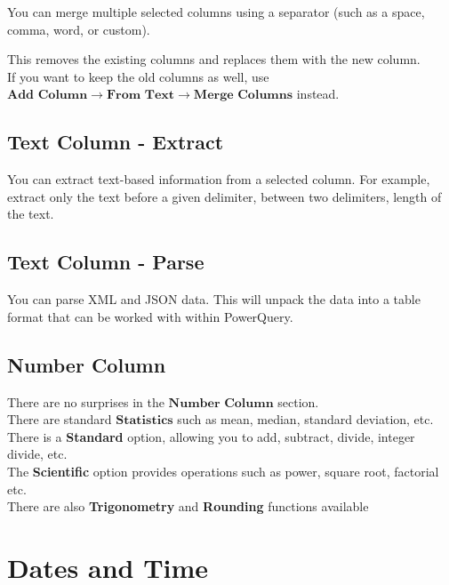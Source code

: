 \documentclass[10pt, openany, twocolumn]{book}
\begin{document}
You can merge multiple selected columns using a separator (such as a space, comma, word, or custom). 

\begin{tcolorbox}[colback=yellow!2!white, colframe=yellow!60!gray]
This removes the existing columns and replaces them with the new column.\\

If you want to keep the old columns as well, use $\textbf{Add Column} \rightarrow \textbf{From Text} \rightarrow \textbf{Merge Columns}$ instead. 
\end{tcolorbox}

\subsection*{Text Column - Extract}

You can extract text-based information from a selected column. For example, extract only the text before a given delimiter, between two delimiters, length of the text.

\subsection*{Text Column - Parse}

You can parse XML and JSON data. This will unpack the data into a table format that can be worked with within PowerQuery.

\subsection*{Number Column} 

There are no surprises in the $\textbf{Number Column}$ section. \\

There are standard $\textbf{Statistics}$ such as mean, median, standard deviation, etc.\\

There is a \textbf{Standard} option, allowing you to add, subtract, divide, integer divide, etc. \\

The \textbf{Scientific} option provides operations such as power, square root, factorial etc.\\

There are also \textbf{Trigonometry} and \textbf{Rounding} functions available

\section{Dates and Time}
\end{document}
